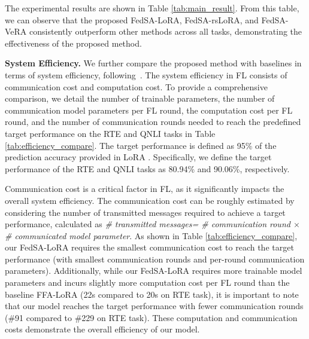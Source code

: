 \documentclass{article} %
\begin{document}
The experimental results are shown in Table \ref{tab:main_result}. From this table, we can observe that the proposed FedSA-LoRA, FedSA-rsLoRA, and FedSA-VeRA consistently outperform other methods across all tasks, demonstrating the effectiveness of the proposed method.


\textbf{System Efficiency.} We further compare the proposed method with baselines in terms of system efficiency, following~\cite{qu2022rethinking, zhang2024flhetbench, lai2022fedscale}. The system efficiency in FL consists of communication cost and computation cost. To provide a comprehensive comparison, we detail the number of trainable parameters, the number of communication model parameters per FL round, the computation cost per FL round, and the number of communication rounds needed to reach the predefined target performance on the RTE and QNLI tasks in Table \ref{tab:efficiency_compare}. The target performance is defined as 95\% of the prediction accuracy provided in LoRA \citep{hulora}. Specifically, we define the target performance of the RTE and QNLI tasks as 80.94\% and 90.06\%, respectively. 


Communication cost is a critical factor in FL, as it significantly impacts the overall system efficiency. The communication cost can be roughly estimated by considering the number of transmitted messages required to achieve a target performance, calculated as \textit{\# transmitted messages= \# communication round $\times$ \# communicated model parameter}. As shown in Table \ref{tab:efficiency_compare}, our FedSA-LoRA requires the smallest communication cost to reach the target performance (with smallest communication rounds and per-round communication parameters). Additionally, while our FedSA-LoRA requires more trainable model parameters and incurs slightly more computation cost per FL round than the baseline FFA-LoRA (22s compared to 20s on RTE task), it is important to note that our model reaches the target performance with fewer communication rounds (\#91 compared to \#229 on RTE task).  These computation and communication costs demonstrate the overall efficiency of our model.
\end{document}

